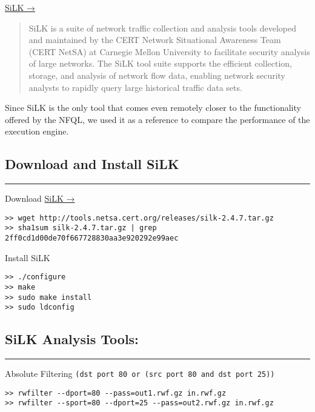 \href{http://tools.netsa.cert.org/silk/}{SiLK →}

\begin{quote}
SiLK is a suite of network traffic collection and analysis tools
developed and maintained by the CERT Network Situational Awareness Team
(CERT NetSA) at Carnegie Mellon University to facilitate security
analysis of large networks. The SiLK tool suite supports the efficient
collection, storage, and analysis of network flow data, enabling network
security analysts to rapidly query large historical traffic data sets.
\end{quote}

Since SiLK is the only tool that comes even remotely closer to the
functionality offered by the NFQL, we used it as a reference to compare
the performance of the execution engine.

\subsection{Download and Install SiLK}

\begin{center}\rule{3in}{0.4pt}\end{center}

Download \href{http://tools.netsa.cert.org/silk/}{SiLK →}

\begin{lstlisting}
>> wget http://tools.netsa.cert.org/releases/silk-2.4.7.tar.gz
>> sha1sum silk-2.4.7.tar.gz | grep 2ff0cd1d00de70f667728830aa3e920292e99aec
\end{lstlisting}

Install SiLK

\begin{lstlisting}
>> ./configure
>> make
>> sudo make install
>> sudo ldconfig
\end{lstlisting}

\subsection{SiLK Analysis Tools:}

\begin{center}\rule{3in}{0.4pt}\end{center}

Absolute Filtering
\lstinline!(dst port 80 or (src port 80 and dst port 25))!

\begin{lstlisting}
>> rwfilter --dport=80 --pass=out1.rwf.gz in.rwf.gz
>> rwfilter --sport=80 --dport=25 --pass=out2.rwf.gz in.rwf.gz
\end{lstlisting}

